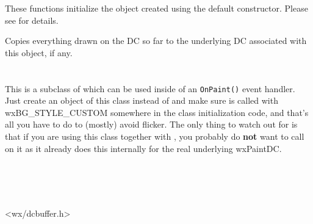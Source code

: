 \label{wxbuffereddcinit}



These functions initialize the object created using the default constructor.
Please see  for details.




\label{wxbuffereddcdtor}

Copies everything drawn on the DC so far to the underlying DC associated with
this object, if any.



\section{}\label{wxbufferedpaintdc}

This is a subclass of  which can be used
inside of an \texttt{OnPaint()} event handler. Just create an object of this class instead
of  and make sure 
is called with wxBG\_STYLE\_CUSTOM somewhere in the class initialization code, and that's all
you have to do to (mostly) avoid flicker. The only thing to watch out for is that if you are
using this class together with , you probably
do \textbf{not} want to call  on it as it
already does this internally for the real underlying wxPaintDC.


\\
\\
\\


<wx/dcbuffer.h>

